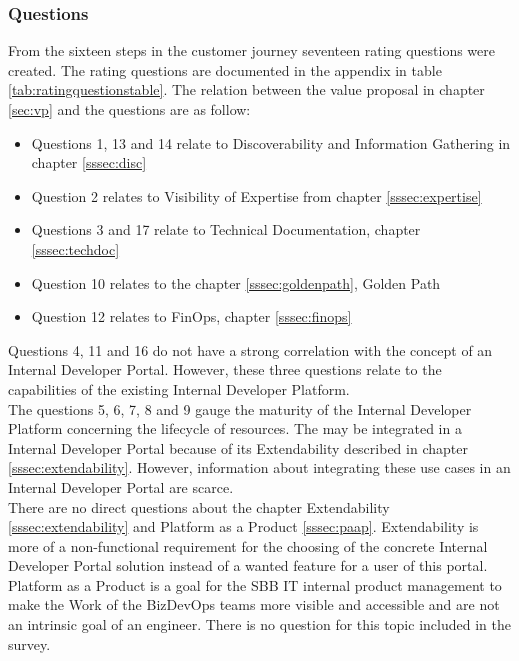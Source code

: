 \documentclass[a4paper,12pt]{article}
\begin{document}
    \subsubsection{Questions}
    \label{sssec:questions}
    From the sixteen steps in the customer journey seventeen rating questions were created.
    The rating questions are documented in the appendix in table \ref{tab:ratingquestionstable}.
    The relation between the value proposal in chapter \ref{sec:vp} and the questions are as follow:
    \begin{itemize}
        \item Questions 1, 13 and 14 relate to Discoverability and Information Gathering in chapter \ref{sssec:disc}
        \item Question 2 relates to Visibility of Expertise from chapter \ref{sssec:expertise}
        \item Questions 3 and 17 relate to Technical Documentation, chapter \ref{sssec:techdoc}
        \item Question 10 relates to the chapter \ref{sssec:goldenpath}, Golden Path
        \item Question 12 relates to FinOps, chapter \ref{sssec:finops}
    \end{itemize}
    Questions 4, 11 and 16 do not have a strong correlation with the concept of an Internal Developer Portal.
    However, these three questions relate to the capabilities of the existing Internal Developer Platform.\\
    The questions 5, 6, 7, 8 and 9 gauge the maturity of the Internal Developer Platform concerning the lifecycle of resources.
    The may be integrated in a Internal Developer Portal because of its Extendability described in chapter \ref{sssec:extendability}.
    However, information about integrating these use cases in an Internal Developer Portal are scarce.\\
    There are no direct questions about the chapter Extendability \ref{sssec:extendability} and Platform as a Product
    \ref{sssec:paap}.
    Extendability is more of a non-functional requirement for the choosing of the concrete Internal Developer Portal
    solution instead of a wanted feature for a user of this portal.\\
    Platform as a Product is a goal for the SBB IT internal product management to make the Work of the BizDevOps
    teams more visible and accessible and are not an intrinsic goal of an engineer.
    There is no question for this topic included in the survey.\\
\end{document}
